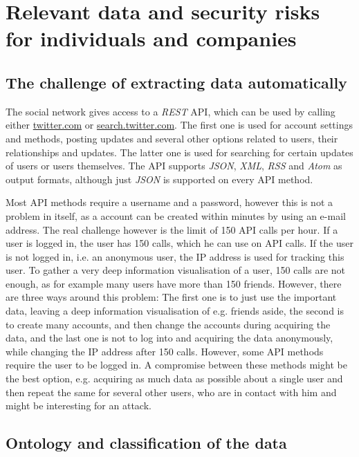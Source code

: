 \section{Relevant data and security risks for individuals and companies}
\label{sec:relevant_data}

\subsection{The challenge of extracting data automatically}

The \Twitter{} social network gives access to a \textit{REST} API, which can be
used by calling either \url{twitter.com} or \url{search.twitter.com}. The first
one is used for account settings and methods, posting updates and several other
options related to users, their relationships and updates. The latter one is used
for searching for certain updates of users or users themselves. The API
supports \textit{JSON}, \textit{XML}, \textit{RSS} and \textit{Atom} as output
formats, although just \textit{JSON} is supported on every API method.

Most API methods require a username and a password, however this is not a
problem in itself, as a \Twitter{} account can be created within minutes by
using an e-mail address. The real challenge however is the limit of 150 API
calls per hour. If a user is logged in, the user has 150 calls, which he can
use on API calls. If the user is not logged in, i.e. an anonymous user, the IP
address is used for tracking this user. To gather a very deep information
visualisation of a user, 150 calls are not enough, as for example many users
have more than 150 friends. However, there are three ways around this problem:
The first one is to just use the important data, leaving a deep information
visualisation of e.g. friends aside, the second is to create many accounts, and
then change the accounts during acquiring the data, and the last one is not to log
into \Twitter{} and acquiring the data anonymously, while changing the IP
address after 150 calls. However, some API methods require the user to be
logged in. A compromise between these methods might be the best option,
e.g. acquiring as much data as possible about a single user and then repeat the
same for several other users, who are in contact with him and might be
interesting for an attack.

\subsection{Ontology and classification of the data}
\label{ssec:ontology}

